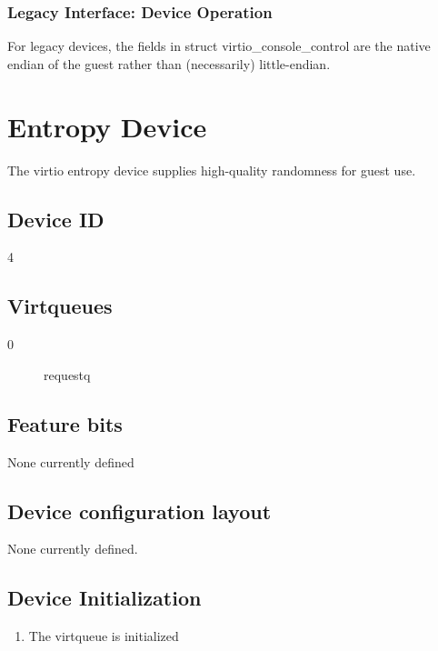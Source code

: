 \subsubsection{Legacy Interface: Device Operation}\label{sec:Device Types / Console Device / Device Operation / Legacy Interface: Device Operation}
For legacy devices, the fields in struct virtio_console_control are the
native endian of the guest rather than (necessarily) little-endian.


\section{Entropy Device}\label{sec:Device Types / Entropy Device}

The virtio entropy device supplies high-quality randomness for
guest use.

\subsection{Device ID}\label{sec:Device Types / Entropy Device / Device ID}
  4

\subsection{Virtqueues}\label{sec:Device Types / Entropy Device / Virtqueues}
\begin{description}
\item[0] requestq
\end{description}

\subsection{Feature bits}\label{sec:Device Types / Entropy Device / Feature bits}
  None currently defined

\subsection{Device configuration layout}\label{sec:Device Types / Entropy Device / Device configuration layout}
  None currently defined.

\subsection{Device Initialization}\label{sec:Device Types / Entropy Device / Device Initialization}

\begin{enumerate}
\item The virtqueue is initialized
\end{enumerate}

